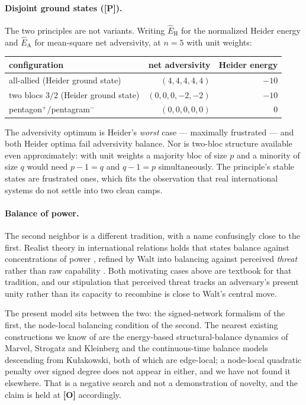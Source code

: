 \documentclass[11pt]{article}
\numberwithin{equation}{section}
\theoremstyle{plain}
\theoremstyle{definition}
\theoremstyle{remark}
\begin{document}
\paragraph{Disjoint ground states (\textbf{[P]}).}\label{ad:rem:disjoint}
The two principles are not variants. Writing $\hat E_{\mathrm H}$ for
the normalized Heider energy and $\hat E_{\mathrm A}$ for mean-square
net adversivity, at $n=5$ with unit weights:
\begin{center}\small
\begin{tabular}{@{}lrr@{}}
\toprule
configuration & net adversivity & Heider energy\\
\midrule
all-allied (Heider ground state) & $(4,4,4,4,4)$ & $-10$\\
two blocs $3/2$ (Heider ground state) & $(0,0,0,-2,-2)$ & $-10$\\
pentagon$^{+}$/pentagram$^{-}$ & $(0,0,0,0,0)$ & $0$\\
\bottomrule
\end{tabular}
\end{center}
The adversivity optimum is Heider's \emph{worst} case --- maximally
frustrated --- and both Heider optima fail adversivity balance. Nor is
two-bloc structure available even approximately: with unit weights a
majority bloc of size $p$ and a minority of size $q$ would need
$p-1=q$ and $q-1=p$ simultaneously. The principle's stable states are
frustrated ones, which fits the observation that real international
systems do not settle into two clean camps.

\paragraph{Balance of power.}

The second neighbor is a different tradition, with a name confusingly
close to the first. Realist theory in international relations holds
that states balance against concentrations of power \cite{Wal79},
refined by Walt into balancing against perceived \emph{threat} rather
than raw capability \cite{Wal87}. Both motivating cases above are textbook for
that tradition, and our stipulation that perceived threat
tracks an adversary's present unity rather than its capacity to
recombine is close to Walt's central move.

The present model sits between the two: the signed-network formalism of
the first, the node-local balancing condition of the second. The nearest
existing constructions we know of are the energy-based structural-balance
dynamics of Marvel, Strogatz and Kleinberg and the continuous-time
balance models descending from Ku{\l}akowski, both of which are
edge-local; a node-local quadratic penalty over signed degree does not
appear in either, and we have not found it elsewhere. That is a negative
search and not a demonstration of novelty, and the claim is held at
\textbf{[O]} accordingly.
\end{document}
